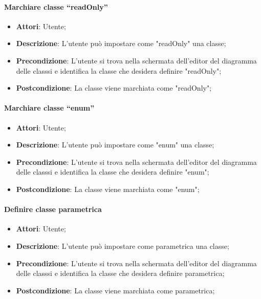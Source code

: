 \paragraph{Marchiare classe “readOnly”}
\begin{itemize}
	\item \textbf{Attori}: Utente;
	\item \textbf{Descrizione}: L'utente può impostare come "readOnly" una classe;
	\item \textbf{Precondizione}: L’utente si trova nella schermata dell’editor del diagramma delle classsi e identifica la classe che desidera definire "readOnly";
	\item \textbf{Postcondizione}: La classe viene marchiata come "readOnly";
\end{itemize}

\paragraph{Marchiare classe “enum”}
\begin{itemize}
	\item \textbf{Attori}: Utente;
	\item \textbf{Descrizione}: L'utente può impostare come "enum" una classe;
	\item \textbf{Precondizione}: L’utente si trova nella schermata dell’editor del diagramma delle classsi e identifica la classe che desidera definire "enum";
	\item \textbf{Postcondizione}: La classe viene marchiata come "enum";
\end{itemize}

\paragraph{Definire classe parametrica}
\begin{itemize}
	\item \textbf{Attori}: Utente;
	\item \textbf{Descrizione}: L'utente può impostare come parametrica una classe;
	\item \textbf{Precondizione}: L’utente si trova nella schermata dell’editor del diagramma delle classsi e identifica la classe che desidera definire parametrica;
	\item \textbf{Postcondizione}: La classe viene marchiata come parametrica;
\end{itemize}

